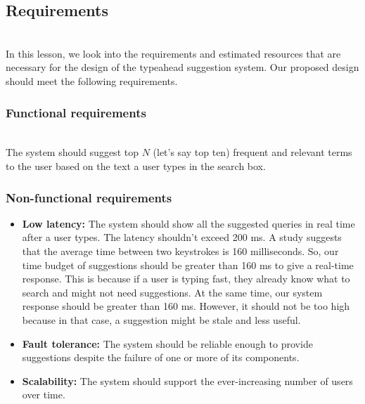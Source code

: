 

\subsection{Requirements}\label{k7Y2v_ciUumvCx5muSkt3}
\\
In this lesson, we look into the requirements and estimated resources that are necessary for the design of the typeahead suggestion system. Our proposed design should meet the following requirements.

\subsubsection{Functional requirements}\label{j21JdNbSCrgDlISuZn1I8}
\\
The system should suggest top \protect{}\label{katex_inline_3NM0FAhcZ70ijcHvOc4sW}{{{\(N\)}}} (let's say top ten) frequent and relevant terms to the user based on the text a user types in the search box.

\subsubsection{Non-functional requirements}\label{uEzqyTpZALCY0Y3tiMDm0}

\begin{itemize}
\item
\protect{}\label{oOVSMHriSX2vvV9YMkcga}
\textbf{Low latency:} The system should show all the suggested queries in real time after a user types. The latency shouldn't exceed 200 ms. A study suggests that the average time between two keystrokes is 160 milliseconds. So, our time budget of suggestions should be greater than 160 ms to give a real-time response. This is because if a user is typing fast, they already know what to search and might not need suggestions. At the same time, our system response should be greater than 160 ms. However, it should not be too high because in that case, a suggestion might be stale and less useful.
\item
\protect{}\label{mEcE0fNxCKQvLpXvrVkDC}
\textbf{Fault tolerance:} The system should be reliable enough to provide suggestions despite the failure of one or more of its components.
\item
\protect{}\label{l2QhqwoWt4K1gkL92_FGR}
\textbf{Scalability:} The system should support the ever-increasing number of users over time.
\end{itemize}


